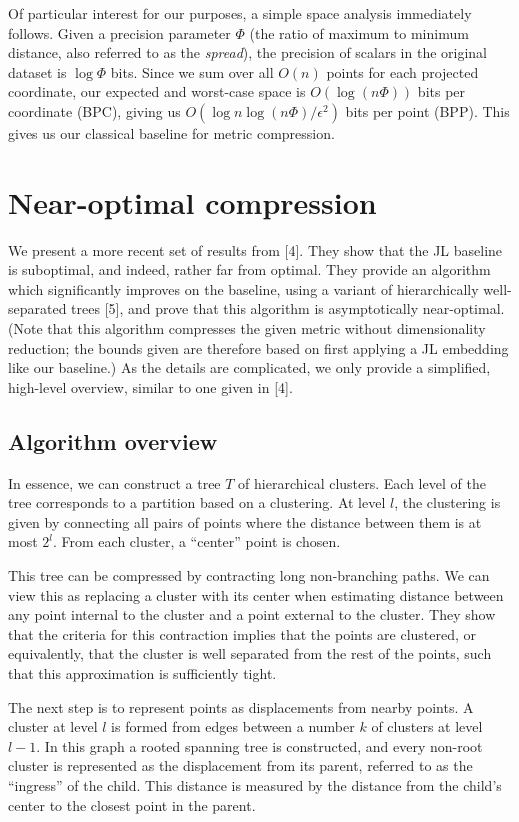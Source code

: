 \documentclass{article}
\begin{document}
Of particular interest for our purposes, a simple space analysis immediately
follows. Given a precision parameter $\Phi$ (the ratio of maximum to minimum
distance, also referred to as the \textit{spread}), the precision of scalars in
the original dataset is $\log \Phi$ bits. Since we sum over all $O(n)$ points for
each projected coordinate, our expected and worst-case space is $O(\log (n\Phi))$
bits per coordinate (BPC), giving us $O(\log n \log (n\Phi) /\epsilon^2)$ bits per point
(BPP). This gives us our classical baseline for metric compression.

\section{Near-optimal compression}

We present a more recent set of results from [4]. They show that the JL baseline
is suboptimal, and indeed, rather far from optimal. They provide an algorithm
which significantly improves on the baseline, using a variant of hierarchically
well-separated trees [5], and prove that this algorithm is asymptotically
near-optimal. (Note that this algorithm compresses the given metric without
dimensionality reduction; the bounds given are therefore based on first applying
a JL embedding like our baseline.) As the details are complicated, we only
provide a simplified, high-level overview, similar to one given in [4].

\subsection{Algorithm overview}

In essence, we can construct a tree $T$ of hierarchical clusters. Each level
of the tree corresponds to a partition based on a clustering. At level $l$, the
clustering is given by connecting all pairs of points where the distance between
them is at most $2^l$. From each cluster, a ``center'' point is chosen.

This tree can be compressed by contracting long non-branching paths. We can view
this as replacing a cluster with its center when estimating distance between any
point internal to the cluster and a point external to the cluster. They show
that the criteria for this contraction implies that the points are clustered, or
equivalently, that the cluster is well separated from the rest of the points,
such that this approximation is sufficiently tight.

The next step is to represent points as displacements from nearby points. A
cluster at level $l$ is formed from edges between a number $k$ of clusters at
level $l-1$. In this graph a rooted spanning tree is constructed, and every
non-root cluster is represented as the displacement from its parent, referred to
as the ``ingress'' of the child. This distance is measured by the distance from
the child's center to the closest point in the parent.
\end{document}
